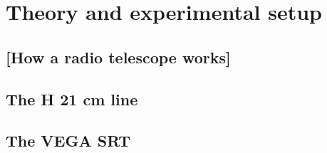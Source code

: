 \section{Theory and experimental setup}
\subsection{[How a radio telescope works]}

\subsection{The H 21 cm line}

\subsection{The VEGA SRT}